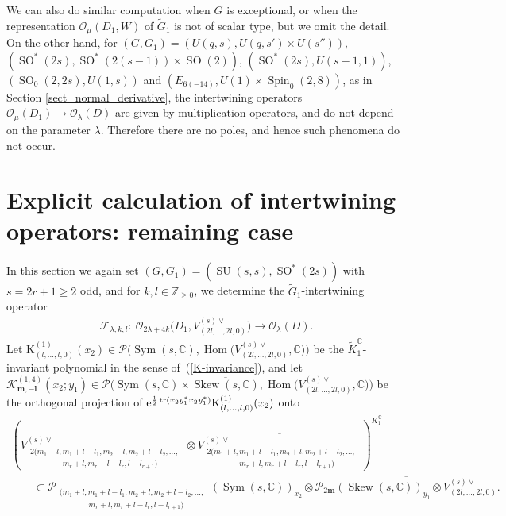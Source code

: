 \documentclass[pdftex]{sigma}
\numberwithin{equation}{section}
\newcommand{\bl}{\mathbf{l}}
\newcommand{\bm}{\mathbf{m}}
\newcommand{\BZ}{\mathbb{Z}}
\newcommand{\BC}{\mathbb{C}}
\newcommand{\cF}{\mathcal{F}}
\newcommand{\cK}{\mathcal{K}}
\newcommand{\cO}{\mathcal{O}}
\newcommand{\cP}{\mathcal{P}}
\newcommand{\rK}{\mathrm{K}}
\newcommand{\Hom}{\operatorname{Hom}}
\newcommand{\tr}{\operatorname{tr}}
\newcommand{\Sym}{\operatorname{Sym}}
\newcommand{\Skew}{\operatorname{Skew}}
\begin{document}
We can also do similar computation when $G$ is exceptional, or when the representation $\cO_\mu(D_1,W)$ of $\tilde{G}_1$ is not of scalar type,
but we omit the detail.
On the other hand, for $(G,G_1)=(U(q,s),U(q,s')\times U(s''))$, $(\operatorname{SO}^*(2s),\operatorname{SO}^*(2(s-1))\times \operatorname{SO}(2))$, $(\operatorname{SO}^*(2s),U(s-1,1))$,
$(\operatorname{SO}_0(2,2s),U(1,s))$ and $(E_{6(-14)},U(1)\times \operatorname{Spin}_0(2,8))$,
as in Section \ref{sect_normal_derivative}, the intertwining operators $\cO_\mu(D_1)\to\cO_\lambda(D)$ are given by
multiplication operators, and do not depend on the parameter $\lambda$.
Therefore there are no poles, and hence such phenomena do not occur.

\section{Explicit calculation of intertwining operators: remaining case}\label{sect_remaining}
In this section we again set $(G,G_1)=(\operatorname{SU}(s,s),\operatorname{SO}^*(2s))$ with $s=2r+1\ge 2$ odd,
and for $k,l\in\BZ_{\ge 0}$, we determine the $\tilde{G}_1$-intertwining operator
\begin{gather*} \cF_{\lambda,k,l}\colon \ \cO_{2\lambda+4k}\big(D_1,V_{(2l,\dots,2l,0)}^{(s)\vee}\big)\to \cO_\lambda(D). \end{gather*}
Let $\rK_{(l,\ldots,l,0)}^{(1)}(x_2)\in \cP\big(\Sym(s,\BC),\Hom\big(V_{(2l,\dots,2l,0)}^{(s)\vee},\BC\big)\big)$ be the $\tilde{K}^\BC_1$-invariant polynomial in the sense of~(\ref{K-invariance}), and let $\cK_{\bm,-\bl}^{(1,4)}(x_2;y_1) \in\cP\big(\Sym(s,\BC)\times\overline{\Skew(s,\BC)},\Hom\big(V_{(2l,\dots,2l,0)}^{(s)\vee},\BC\big)\big)$ be the orthogonal projection of
${\rm e}^{\frac{1}{2}\tr(x_2y_1^*x_2y_1^*)}\rK_{(l,\ldots,l,0)}^{(1)}(x_2)$ onto
\begin{gather*}
 \left(V_{\substack{2(m_1+l,m_1+l-l_1,m_2+l,m_2+l-l_2,\ldots,\;\\ \hspace{50pt}
m_r+l,m_r+l-l_r,l-l_{r+1})}}^{(s)\vee}\otimes\overline{
V_{\substack{2(m_1+l,m_1+l-l_1,m_2+l,m_2+l-l_2,\ldots,\;\\ \hspace{50pt}
m_r+l,m_r+l-l_r,l-l_{r+1})}}^{(s)\vee}}\right)^{K_1^\BC}\\
\qquad{} \subset \cP_{\substack{(m_1+l,m_1+l-l_1,m_2+l,m_2+l-l_2,\ldots,\;\\ \hspace{45pt}
m_r+l,m_r+l-l_r,l-l_{r+1})}}(\Sym(s,\BC))_{x_2}
\otimes\overline{\cP_{2\bm}(\Skew(s,\BC))_{y_1}\otimes V_{(2l,\ldots,2l,0)}^{(s)\vee}}.
\end{gather*}
\end{document}
